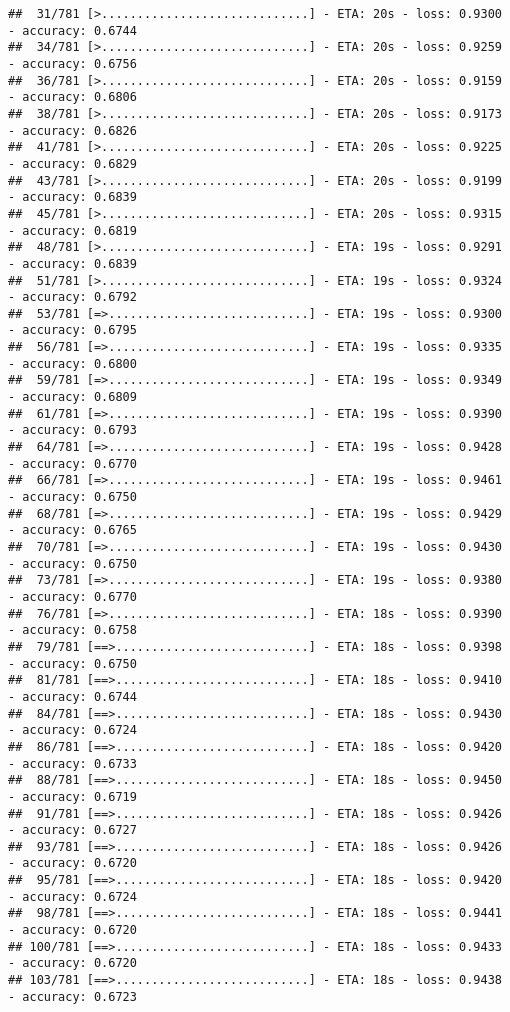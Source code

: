 \documentclass[
]{article}
\begin{document}
\begin{verbatim}
##  31/781 [>.............................] - ETA: 20s - loss: 0.9300 - accuracy: 0.6744
##  34/781 [>.............................] - ETA: 20s - loss: 0.9259 - accuracy: 0.6756
##  36/781 [>.............................] - ETA: 20s - loss: 0.9159 - accuracy: 0.6806
##  38/781 [>.............................] - ETA: 20s - loss: 0.9173 - accuracy: 0.6826
##  41/781 [>.............................] - ETA: 20s - loss: 0.9225 - accuracy: 0.6829
##  43/781 [>.............................] - ETA: 20s - loss: 0.9199 - accuracy: 0.6839
##  45/781 [>.............................] - ETA: 20s - loss: 0.9315 - accuracy: 0.6819
##  48/781 [>.............................] - ETA: 19s - loss: 0.9291 - accuracy: 0.6839
##  51/781 [>.............................] - ETA: 19s - loss: 0.9324 - accuracy: 0.6792
##  53/781 [=>............................] - ETA: 19s - loss: 0.9300 - accuracy: 0.6795
##  56/781 [=>............................] - ETA: 19s - loss: 0.9335 - accuracy: 0.6800
##  59/781 [=>............................] - ETA: 19s - loss: 0.9349 - accuracy: 0.6809
##  61/781 [=>............................] - ETA: 19s - loss: 0.9390 - accuracy: 0.6793
##  64/781 [=>............................] - ETA: 19s - loss: 0.9428 - accuracy: 0.6770
##  66/781 [=>............................] - ETA: 19s - loss: 0.9461 - accuracy: 0.6750
##  68/781 [=>............................] - ETA: 19s - loss: 0.9429 - accuracy: 0.6765
##  70/781 [=>............................] - ETA: 19s - loss: 0.9430 - accuracy: 0.6750
##  73/781 [=>............................] - ETA: 19s - loss: 0.9380 - accuracy: 0.6770
##  76/781 [=>............................] - ETA: 18s - loss: 0.9390 - accuracy: 0.6758
##  79/781 [==>...........................] - ETA: 18s - loss: 0.9398 - accuracy: 0.6750
##  81/781 [==>...........................] - ETA: 18s - loss: 0.9410 - accuracy: 0.6744
##  84/781 [==>...........................] - ETA: 18s - loss: 0.9430 - accuracy: 0.6724
##  86/781 [==>...........................] - ETA: 18s - loss: 0.9420 - accuracy: 0.6733
##  88/781 [==>...........................] - ETA: 18s - loss: 0.9450 - accuracy: 0.6719
##  91/781 [==>...........................] - ETA: 18s - loss: 0.9426 - accuracy: 0.6727
##  93/781 [==>...........................] - ETA: 18s - loss: 0.9426 - accuracy: 0.6720
##  95/781 [==>...........................] - ETA: 18s - loss: 0.9420 - accuracy: 0.6724
##  98/781 [==>...........................] - ETA: 18s - loss: 0.9441 - accuracy: 0.6720
## 100/781 [==>...........................] - ETA: 18s - loss: 0.9433 - accuracy: 0.6720
## 103/781 [==>...........................] - ETA: 18s - loss: 0.9438 - accuracy: 0.6723

\end{verbatim}
\end{document}
